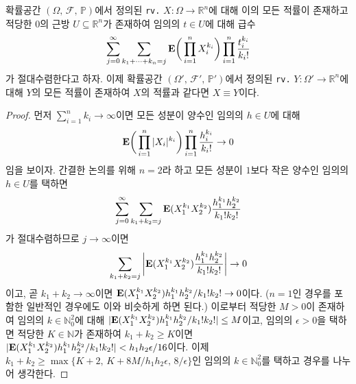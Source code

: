 \begin{theorem}
    확률공간 $(\Omega,\,\mathcal{F},\,\mathbb{P})$에서 정의된 \texttt{rv.} $X:\Omega\to\mathbb{R}^n$에 대해 이의 모든 적률이 존재하고 적당한 $0$의 근방 $U\subseteq\mathbb{R}^n$가 존재하여 임의의 $t\in U$에 대해 급수
    \begin{equation*}
        \sum_{j=0}^\infty\sum_{k_1+\cdots+k_n=j}\mathbf{E}\bigg(\prod_{i=1}^nX_i^{k_i}\bigg)\prod_{i=1}^n\frac{t_i^{k_i}}{k_i!}
    \end{equation*}
    가 절대수렴한다고 하자. 이제 확률공간 $(\Omega',\,\mathcal{F}',\,\mathbb{P}')$에서 정의된 \texttt{rv.} $Y:\Omega'\to\mathbb{R}^n$에 대해 $Y$의 모든 적률이 존재하여 $X$의 적률과 같다면 $X\equiv Y$이다.
\end{theorem}

\begin{proof}
    먼저 $\sum_{i=1}^nk_i\to\infty$이면 모든 성분이 양수인 임의의 $h\in U$에 대해
    \begin{equation*}
        \mathbf{E}\bigg(\prod_{i=1}^n|X_i|^{k_i}\bigg)\prod_{i=1}^n\frac{h_i^{k_i}}{k_i!}\to0
    \end{equation*}
    임을 보이자. 간결한 논의를 위해 $n=2$라 하고 모든 성분이 $1$보다 작은 양수인 임의의 $h\in U$를 택하면
    \begin{equation*}
        \sum_{j=0}^\infty\sum_{k_1+k_2=j}\mathbf{E}(X_1^{k_1}X_2^{k_2})\frac{h_1^{k_1}h_2^{k_2}}{k_1!k_2!}
    \end{equation*}
    가 절대수렴하므로 $j\to\infty$이면 
    \begin{equation*}
        \sum_{k_1+k_2=j}\bigg|\mathbf{E}(X_1^{k_1}X_2^{k_2})\frac{h_1^{k_1}h_2^{k_2}}{k_1!k_2!}\bigg|\to0
    \end{equation*}
    이고, 곧 $k_1+k_2\to\infty$이면 $\mathbf{E}(X_1^{k_1}X_2^{k_2})h_1^{k_1}h_2^{k_2}/k_1!k_2!\to0$이다. ($n=1$인 경우를 포함한 일반적인 경우에도 이와 비슷하게 하면 된다.) 이로부터 적당한 $M>0$이 존재하여 임의의 $k\in\mathbb{N}_0^2$에 대해 $|\mathbf{E}(X_1^{k_1}X_2^{k_2})h_1^{k_1}h_2^{k_2}/k_1!k_2!|\leq M$이고, 임의의 $\epsilon>0$을 택하면 적당한 $K\in\mathbb{N}$가 존재하여 $k_1+k_2\geq K$이면 $|\mathbf{E}(X_1^{k_1}X_2^{k_2})h_1^{k_1}h_2^{k_2}/k_1!k_2!|<h_1h_2\epsilon/16$이다. 이제 $k_1+k_2\geq \max\{K+2,\,K+8M/h_1h_2\epsilon,\,8/\epsilon\}$인 임의의 $k\in\mathbb{N}_0^2$를 택하고 경우를 나누어 생각한다.
    

\end{proof}
